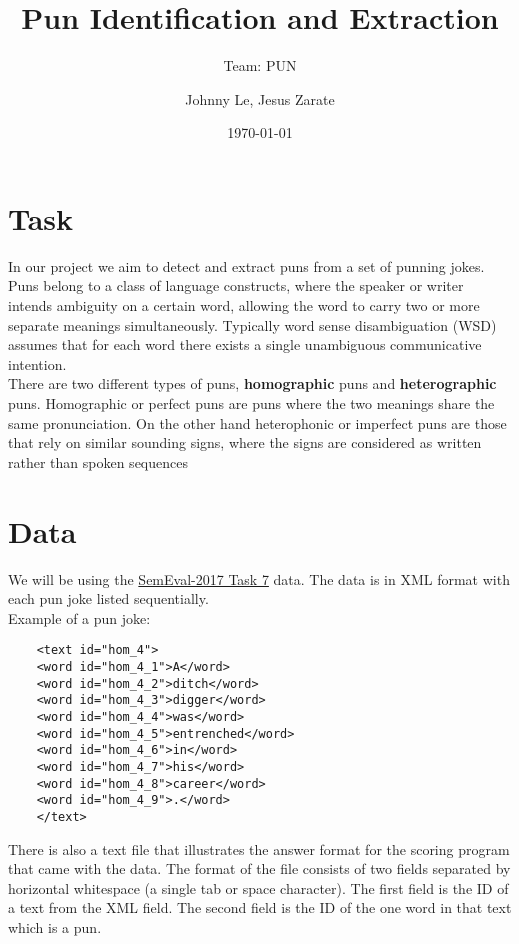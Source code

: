 \documentclass{article}
\title{Pun Identification and Extraction}
\author{Team: PUN}
\author{Johnny Le, Jesus Zarate}
\date{\today}
\begin{document}
\maketitle


\section{Task}

In our project we aim to detect and extract puns from a set of punning jokes. Puns
belong to a class of language constructs, where the speaker or writer intends ambiguity
on a certain word, allowing the word to carry two or more separate meanings
simultaneously.
Typically word sense disambiguation \big(WSD\big) assumes that for each
 word there exists a single unambiguous communicative intention.\\

\noindent There are two different types of puns, {\textbf{homographic} } puns and {\textbf{heterographic} } puns.
Homographic or perfect puns are puns where the two meanings share the same pronunciation.
On the other hand heterophonic or imperfect puns are those that rely on similar sounding
signs, where the signs are considered as written rather than spoken sequences




\section{Data}\label{sec:data}

We will be using the
\href{http://alt.qcri.org/semeval2017/task7/}{SemEval-2017 Task 7}
data.
The data is in XML format with each pun joke listed sequentially.\\

Example of a pun joke:\\

\begin{lstlisting}
    <text id="hom_4">
    <word id="hom_4_1">A</word>
    <word id="hom_4_2">ditch</word>
    <word id="hom_4_3">digger</word>
    <word id="hom_4_4">was</word>
    <word id="hom_4_5">entrenched</word>
    <word id="hom_4_6">in</word>
    <word id="hom_4_7">his</word>
    <word id="hom_4_8">career</word>
    <word id="hom_4_9">.</word>
    </text>
\end{lstlisting}

\noindent There is also a text file that illustrates the answer format for the scoring program that came with the data.
The format of the file consists of two fields separated by horizontal whitespace
(a single tab or space character).
The first field is the ID of a text from the XML field.
The second field is the ID of the one word in that text which is a pun.\\
\end{document}
